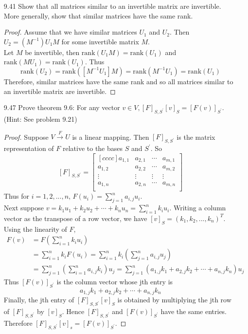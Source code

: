 \documentclass[12pt]{article}
\theoremstyle{definition}
\theoremstyle{plain}
\begin{document}
\begin{enumerate}
\item[9.41]Show that all matrices similar to an invertible matrix are invertible. More generally, show that similar matrices have the same rank.\\
	\begin{proof}
	Assume that we have similar matrices $U_1$ and $U_2$. Then $U_2=(M^{-1})U_1M$ for some invertible matrix $M$.\\
	Let $M$ be invertible, then $\mathrm{rank}(U_1M)=\mathrm{rank}(U_1)$ and $\mathrm{rank}(MU_1)=\mathrm{rank}(U_1)$. Thus
	\[ \mathrm{rank}(U_2)=\mathrm{rank}([M^{-1}U_1]M)=\mathrm{rank}(M^{-1}U_1)=\mathrm{rank}(U_1) \]
	Therefore, similar matrices have the same rank and so all matrices similar to an invertible matrix are invertible.
	\end{proof}
\item[9.47]Prove theorem 9.6: For any vector $v\in V,[F]_{S,S^\prime}[v]_S=[F(v)]_{S^\prime}$. (Hint: See problem 9.21)\\
	\begin{proof}
	Suppose $V \xrightarrow[]{F} U$ is a linear mapping. Then $[F]_{S,S^\prime}$ is the matrix representation of $F$ relative to the bases $S$ and $S^\prime$. So
	\[ [F]_{S,S^\prime} = \begin{bmatrix}[cccc]a_{1,1}&a_{2,1}&\cdots &a_{m,1}\\a_{1,2}&a_{2,2}&\cdots &a_{m,2}\\\vdots & \vdots & \vdots & \vdots\\a_{1,n}&a_{2,n}&\cdots &a_{m,n}\\\end{bmatrix} \]
	Thus for $i=1,2,...,n$, $F(u_i)=\sum_{j=1}^n a_{i,j}u_i$.\\
	Next suppose $v=k_1u_1+k_2u_2+\cdots +k_nu_n=\sum_{i=1}^n k_iu_i$. Writing a column vector as the transpose of a row vector, we have $[v]_S=(k_1,k_2,...,k_n)^T$.\\
	Using the linearity of $F$,
	\begin{align*}
	F(v)&=F\left (\sum_{i=1}^nk_iu_i\right )\\
	&=\sum_{i=1}^nk_iF(u_i)=\sum_{i=1}^nk_i\left (\sum_{j=1}^na_{i,j}u_j\right )\\
	&= \sum_{j=1}^n\left (\sum_{i=1}^na_{i,j}k_i\right )u_j = \sum_{j=1}^n(a_{1,j}k_1+a_{2,j}k_2+\cdots + a_{n,j}k_n)u_j
	\end{align*}
	Thus $[F(v)]_{S^\prime}$ is the column vector whose jth entry is
	\[ a_{1,j}k_1+a_{2,j}k_2+\cdots +a_{n,j}k_n \]
	Finally, the jth entry of $[F]_{S,S^\prime}[v]_S$ is obtained by multiplying the jth row of $[F]_{S,S^\prime}$ by $[v]_S$. Hence $[F]_{S,S^\prime}$ and $[F(v)]_{S^\prime}$ have the same entries. Therefore $[F]_{S,S^\prime}[v]_s=[F(v)]_{S^\prime}$.
	\end{proof}





\end{enumerate}
\end{document}
